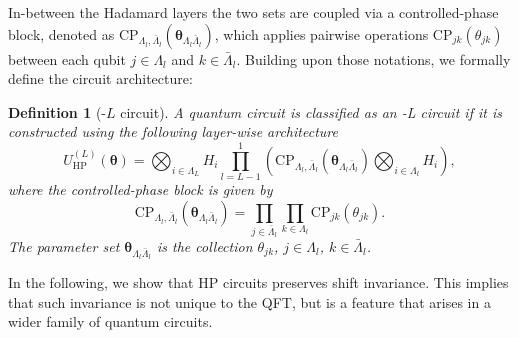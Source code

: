 \documentclass[reprint, aps, prl, superscriptaddress]{revtex4-2}
\newcommand{\myqc}{\text{HP}}
\newcommand{\uqc}[1]{U_{\mathrm{HP}}^{(#1)}}
\newcommand{\cpgate}[3]{\mathrm{CP}_{#1, #2}(#3)}
\newtheorem{definition}{Definition}
\begin{document}


In-between the Hadamard layers the two sets are coupled via a controlled-phase block, denoted as $\cpgate{\Lambda_l}{\bar{\Lambda}_l}{\bm{\theta}_{\Lambda_l\bar{\Lambda}_l}}$, which applies pairwise operations $\mathrm{CP}_{jk}(\theta_{jk})$ between each qubit $j \in \Lambda_l$ and $k \in \bar{\Lambda}_l$. Building upon those notations, we formally define the circuit architecture:
\begin{definition}[\myqc-$L$ circuit]
    A quantum circuit is classified as an \myqc-L circuit if it is constructed using the following layer-wise architecture
    \begin{equation}
        \uqc{L}({\bm{\theta}}) = \bigotimes_{i \in \Lambda_L} H_{i}\prod_{l=L-1}^{1} \left( \cpgate{\Lambda_l}{\bar{\Lambda}_l}{\bm{\theta}_{\Lambda_l\bar{\Lambda}_l}} \bigotimes_{i \in \Lambda_l} H_{i} \right),
    \end{equation}
    where the controlled-phase block is given by
    \begin{equation}
        \cpgate{\Lambda_l}{\bar{\Lambda}_l}{\bm{\theta}_{\Lambda_l\bar{\Lambda}_l}} = \prod_{j \in \bar{\Lambda}_l} \prod_{k \in \Lambda_l} \mathrm{CP}_{jk}(\theta_{jk}).
    \end{equation}
    The parameter set $\bm{\theta}_{\Lambda_l\bar{\Lambda}_l}$ is the collection $\theta_{jk}$, $j\in \Lambda_l$, $k \in \bar{\Lambda}_l$. 
\end{definition}


    
In the following, we show that HP circuits preserves shift invariance. This implies that such invariance is not unique to the QFT, but is a feature that arises in a wider family of quantum circuits. 
\end{document}
